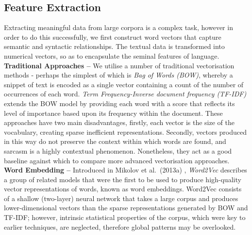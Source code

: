 \documentclass[12pt,a4paper]{article}
\begin{document}

\subsection{Feature Extraction}
\vspace{-4.2pt}
\noindent Extracting meaningful data from large corpora is a complex task, however in order to do this successfully, we first construct word vectors that capture semantic and syntactic relationships. The textual data is transformed into numerical vectors, so as to encapsulate the seminal features of language.\\

\noindent \textbf{Traditional Approaches --} We utilise a number of traditional vectorisation methods - perhaps the simplest of which is \textit{Bag of Words (BOW)}, whereby a snippet of text is encoded as a single vector containing a count of the number of occurrences of each word. \textit{Term Frequency-Inverse document frequency (TF-IDF)} \cite{robertson1976relevance} extends the BOW model by providing each word with a score that reflects its level of importance based upon its frequency within the document. These approaches have two main disadvantages, firstly, each vector is the size of the vocabulary, creating sparse inefficient representations. Secondly, vectors produced in this way do not preserve the context within which words are found, and sarcasm is a highly contextual phenomenon. Nonetheless, they act as a good baseline against which to compare more advanced vectorisation approaches.\\

\noindent \textbf{Word Embedding --} Introduced in Mikolov et al.\ (2013a) \cite{mikolov2013efficient}, \textit{Word2Vec} describes a group of related models that were the first to be used to produce high-quality vector representations of words, known as word embeddings. Word2Vec consists of a shallow (two-layer) neural network that takes a large corpus and produces lower-dimensional vectors than the sparse representations generated by BOW and TF-IDF; however, intrinsic statistical properties of the corpus, which were key to earlier techniques, are neglected, therefore global patterns may be overlooked.\\\vspace{-10pt}
\end{document}
